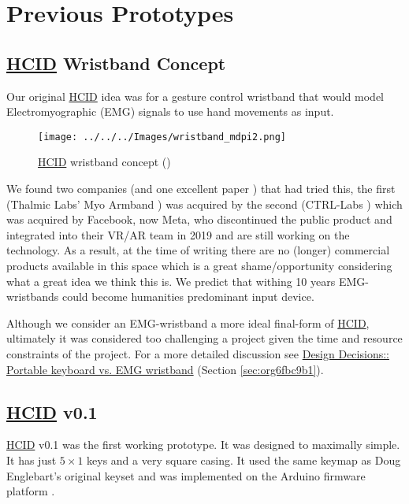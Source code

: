 \documentclass[logo,bsc,singlespacing,parskip]{infthesis}
\begin{document}
\chapter{Previous Prototypes}
\label{sec:org64b7fb9}
\section{\hyperref[org30e2275]{HCID} Wristband Concept}
\label{sec:org91b5972}
Our original \hyperref[org30e2275]{HCID} idea was for a gesture control wristband that would model Electromyographic (EMG) signals to use hand movements as input.

\begin{figure}[h]
\centering
\texttt{[image: ../../../Images/wristband\_mdpi2.png]}
\caption{\hyperref[org30e2275]{HCID} wristband concept (\autocite{cote-allardLowCostWireless3DPrinted2019})}
\end{figure}

We found two companies (and one excellent paper \autocite{cote-allardLowCostWireless3DPrinted2019}) that had tried this, the first (Thalmic Labs' Myo Armband \autocite{MyoGestureControl}) was acquired by the second (CTRL-Labs \autocite{27CTRLlabsLinkedIn}) which was acquired by Facebook, now Meta, who discontinued the public product and integrated into their VR/AR team in 2019 and are still working on the technology.
As a result, at the time of writing there are no (longer) commercial products available in this space which is a great shame/opportunity considering what a great idea we think this is.
We predict that withing 10 years EMG-wristbands could become humanities predominant input device.

Although we consider an EMG-wristband a more ideal final-form of \hyperref[org30e2275]{HCID}, ultimately it was considered too challenging a project given the time and resource constraints of the project. For a more detailed discussion see \hyperref[sec:org6fbc9b1]{Design Decisions:: Portable keyboard vs. EMG wristband} (Section \ref{sec:org6fbc9b1}).
\section{\hyperref[org30e2275]{HCID} v0.1}
\label{sec:org094b28c}
\hyperref[org30e2275]{HCID} v0.1
was the first working prototype.
It was designed to maximally simple.
It has just \(5\times1\) keys and a very square casing.
It used the same keymap as Doug Englebart's original keyset and was implemented on the Arduino firmware platform \autocite{ArduinoHome}.
\end{document}
